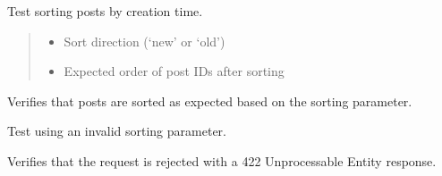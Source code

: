 \documentclass[letterpaper,10pt,openany,oneside,english]{sphinxmanual}
\begin{document}
\begin{savenotes}\begin{fulllineitems}
\label{\detokenize{modules/tests:storeapi.tests.routers.test_posts.test_get_all_posts_sorting}}
\pysigstartsignatures
{}
\pysigstopsignatures
\sphinxAtStartPar
Test sorting posts by creation time.
\begin{quote}\begin{description}
\begin{itemize}
\item {} 
\sphinxAtStartPar
{} \textendash{} Sort direction (‘new’ or ‘old’)

\item {} 
\sphinxAtStartPar
{} \textendash{} Expected order of post IDs after sorting

\end{itemize}

\end{description}\end{quote}

\sphinxAtStartPar
Verifies that posts are sorted as expected based on the sorting parameter.

\end{fulllineitems}\end{savenotes}


\begin{savenotes}\begin{fulllineitems}
\label{\detokenize{modules/tests:storeapi.tests.routers.test_posts.test_get_all_posts_wrong_sorting}}
\pysigstartsignatures
{}
\pysigstopsignatures
\sphinxAtStartPar
Test using an invalid sorting parameter.

\sphinxAtStartPar
Verifies that the request is rejected with a 422 Unprocessable Entity response.

\end{fulllineitems}\end{savenotes}
\end{document}
